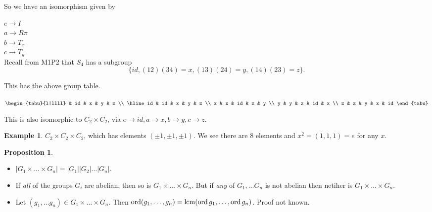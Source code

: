\documentclass{article}
\theoremstyle{definition} \newtheorem*{definition}{Definition}
\newtheorem{proposition}[theorem]{Proposition}
\newtheorem*{exmp}{Example} \newtheorem*{exmps}{Examples}
\DeclareMathOperator{\lcm}{lcm} \DeclareMathOperator{\hcf}{hcf}
\begin{document}
So we have an isomorphism given by

$e \rightarrow I$\\ $a \rightarrow R\pi$\\ $b \rightarrow T_x$\\ $c \rightarrow
T_y$\\

Recall from M1P2 that $S_4$ has a subgroup $$\{id,  (12)(34)=x, (13)(24)=y,
(14)(23)=z\}.$$

This has the above group table.  \begin{table}[!ht] \centering
  $\begin{tabu}{l|llll} & id & x  & y  & z \\ \hline id & id & x  & y  & z \\ x
    & x  & id & z  & y \\ y  & y  & z  & id & x \\ z  & z  & y  & x  & id
  \end{tabu}$ \end{table}

This is also isomorphic to $C_2 \times C_2$, via $e \rightarrow id, a
\rightarrow x, b \rightarrow y, c \rightarrow z$.\\

\begin{exmp}
  
$C_2 \times C_2 \times C_2$, which has elements $(\pm 1, \pm 1, \pm 1)$. We see
there are 8 elements and $x^2=(1,1,1)=e$ for any $x$.\\ \end{exmp}

\begin{proposition}\hfill \label{prp:ordgroup} \begin{itemize} \item $|G_1
        \times \ldots \times G_n| =|G_1||G_2|\ldots|G_n|.$ \item If \emph{all}
          of the groups $G_i$ are abelian, then so is $G_1 \times \ldots \times
          G_n$. But if \emph{any} of $G_1, \ldots G_n$ is not abelian then
          netiher is $G_1 \times \ldots \times G_n$.  \item Let $(g_1, \ldots
            g_n) \in G_1 \times \ldots \times G_n$. Then $\ord (g_1, \ldots ,
            g_n) = \lcm (\ord g_1, \ldots , \ord g_n)$.  Proof not known.
        \end{itemize} \end{proposition}
\end{document}
